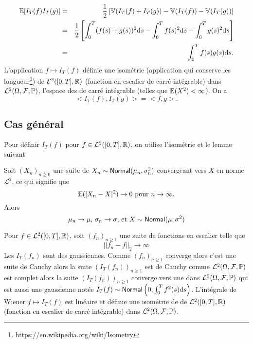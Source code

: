 \begin{eqnarray*}
\mathbb{E}[I_T(f)I_T(g)] &=& \frac{1}{2}\left[\mathbb{V}(I_T(f)+I_T(g))-\mathbb{V}(I_T(f))- \mathbb{V}(I_T(g))\right]\\
&=& \frac{1}{2}\left[\int_0^T(f(s)+g(s))^2\text{d}s-\int_0^Tf(s)^2\text{d}s- \int_0^Tg(s)^2\text{d}s\right]\\
&=&\int_0^Tf(s)g(s)\text{d}s.
\end{eqnarray*}
L'application $f\mapsto I_T(f)$ définie une isométrie (application qui conserve les longueur\footnote{https://en.wikipedia.org/wiki/Isometry}) de $\mathcal{E}^2([0,T],\mathbb{R})$ (fonction en escalier de carré intégrable) dans $\mathcal{L}^2(\Omega,\mathcal{F},\mathbb{P})$, l'espace des \va de carré intégrable (telles que $\mathbb{E}(X^2)<\infty$). On a 
$$
<I_T(f), I_T(g)> = <f,g>.
$$
\subsection{Cas général}
Pour définir $I_T(f)$ pour $f\in\mathcal{L}^2([0,T],\mathbb{R})$, on utilise l'isométrie et le lemme suivant 
\begin{lemma}
Soit $(X_n)_{n\geq0}$ une suite de \va $X_n\sim\mathsf{Normal}(\mu_n,\sigma_n^2)$ convergeant vers $X$ en norme $\mathcal{L}^2$, ce qui signifie que 
$$
\mathbb{E}(|X_n-X|^2)\rightarrow 0\text{ pour }n\rightarrow \infty.
$$
Alors 
$$
\mu_n\rightarrow\mu\text{, } \sigma_n\rightarrow\sigma\text{, et }X\sim\mathsf{Normal}(\mu,\sigma^2)
$$
\end{lemma}

Pour $f\in\mathcal{L}^2([0,T],\mathbb{R})$, soit $(f_n)_{n\geq 1}$ une suite de fonctions en escalier telle que 
$$
||f_n - f||_2\rightarrow\infty
$$
Les \va $I_T(f_n)$ sont des \va gaussiennes. Comme $(f_n)_{n\geq 1}$ converge alors c'est une suite de Cauchy alors la suite $(I_T(f_n))_{n\geq 1}$ est de Cauchy comme $\mathcal{L}^2(\Omega, \mathcal{F}, \mathbb{P})$ est complet alors la suite $(I_T(f_n))_{n\geq 1}$ converge vers une \va dans $\mathcal{L}^2(\Omega, \mathcal{F}, \mathbb{P})$ qui est aussi une \va gaussienne notée $I_T(f)\sim\mathsf{Normal}\left(0,\int_0^T f^2(s)\text{d}s\right)$. L'intégrale de Wiener $f\mapsto I_T(f)$ est linéaire et définie une isométrie de de $\mathcal{L}^2([0,T],\mathbb{R})$ (fonction en escalier de carré intégrable) dans $\mathcal{L}^2(\Omega,\mathcal{F},\mathbb{P})$. 

